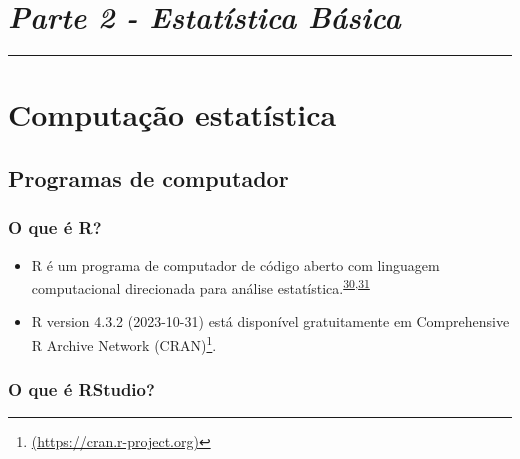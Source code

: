 \documentclass[
  a4paper,
]{book}
\renewcommand{\href}[2]{#2\footnote{\url{#1}}}
\begin{document}
\hypertarget{parte-2---estatuxedstica-buxe1sica}{%
\chapter*{\texorpdfstring{\emph{Parte 2 - Estatística Básica}}{Parte 2 - Estatística Básica}}\label{parte-2---estatuxedstica-buxe1sica}}

\markboth{}{}
\par\noindent\rule{\textwidth}{0.05in}

\hypertarget{computacao-estatistica}{%
\chapter{\texorpdfstring{\textbf{Computação estatística}}{Computação estatística}}\label{computacao-estatistica}}

\hypertarget{programas-computador}{%
\section{Programas de computador}\label{programas-computador}}

\hypertarget{o-que-uxe9-r}{%
\subsection{O que é R?}\label{o-que-uxe9-r}}

\begin{itemize}
\item
  R é um programa de computador de código aberto com linguagem computacional direcionada para análise estatística.\textsuperscript{\protect\hyperlink{ref-ihaka1996}{30},\protect\hyperlink{ref-introduc2020}{31}}
\item
  R version 4.3.2 (2023-10-31) está disponível gratuitamente em \href{(https://cran.r-project.org)}{Comprehensive R Archive Network (CRAN)}.
\end{itemize}

\hypertarget{o-que-uxe9-rstudio}{%
\subsection{O que é RStudio?}\label{o-que-uxe9-rstudio}}
\end{document}
